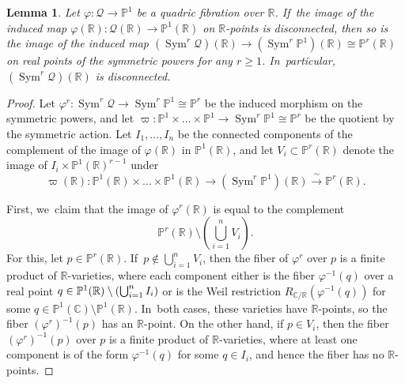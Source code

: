 \documentclass[JEP,XML,SOM,Unicode,NoEqCountersInSection,published]{cedram}
\let\cal\mathcal
\let\bb\mathbb\let\Bbb\mathbb
\theoremstyle{plain}
\newtheorem{lem}[thm]{Lemma}
\theoremstyle{definition}
\DeclareMathOperator{\Sym}{Sym}
\let\phi\varphi
\renewcommand\P{\mathbb{P}}
\newcommand\C{\mathbb{C}}
\newcommand\R{\mathbb{R}}
\begin{document}
\begin{lem}\label{lem:real-locus-symmetric-power}
Let \(\phi\colon \mathcal{Q} \to \bb P^1\) be a quadric fibration over \(\bb R\). If~the image of the induced map \(\phi(\bb R)\colon \mathcal{Q}(\bb R)\to\bb P^1(\bb R)\) on \(\bb R\)-points is disconnected, then so is the image of the induced map \((\Sym^r \mathcal{Q})(\bb R)\to(\Sym^r \bb P^1)(\bb R) \cong \bb P^r(\bb R)\) on real points of the symmetric powers for any \(r\geq 1\). In~particular, \((\Sym^r \mathcal{Q})(\bb R)\) is disconnected.
\end{lem}
\begin{proof}
Let \(\phi^r\colon \Sym^r \cal Q \to \Sym^r \bb P^1 \cong \bb P^r\) be the induced morphism on the symmetric powers, and let \(\varpi\colon \bb P^1\times\dots\times\bb P^1 \to \Sym^r \bb P^1\cong\bb P^r\) be the quotient by the symmetric action.
Let $I_1,\dots, I_n$ be the connected components of the complement of the image of $\phi(\R)$ in $\P^1(\R)$, and let \(V_i \subset \bb P^r(\bb R)\) denote the image of $I_i\times\P^1(\R)^{r-1}$ under
\[
\varpi(\bb R)\colon \P^1(\R)\times\dots\times\P^1(\R)\to (\Sym^r\P^1)(\R)\xrightarrow{\;\sim\;}\P^r(\R).
\]

First, we~claim that the image of \(\phi^r(\bb R)\) is equal to the complement
\[
\P^r(\R)\setminus (\bigcup_{i=1}^n V_i).
\]
For this, let \(p\in \bb P^r(\bb R)\). If~\(p\notin\bigcup_{i=1}^n V_i\), then the fiber of $\phi^r$ over $p$ is a finite product of $\R$-varieties, where each component either is the fiber $\phi^{-1}(q)$ over a real point $q\in\nobreak \P^1(\R)\setminus (\bigcup_{i=1}^n I_i)$ or is the Weil restriction $R_{\C/\R}(\phi^{-1}(q))$ for some \hbox{$q\in \P^1(\C)\setminus \P^1(\R)$}. In~both cases, these varieties have \(\bb R\)-points, so the fiber \((\phi^r)^{-1}(p)\) has an $\R$-point.
On the other hand, if $p \in V_i$, then the fiber \((\phi^r)^{-1}(p)\) over $p$ is a finite product of $\R$-varieties, where at least one component is of the form $\phi^{-1}(q)$ for some $q\in I_i$, and hence the fiber has no $\R$-points.


\end{proof}
\end{document}
